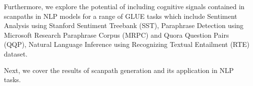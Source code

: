 

Furthermore, we explore the potential of including cognitive signals contained in scanpaths in NLP models for a range of GLUE tasks which include Sentiment Analysis using Stanford Sentiment Treebank (SST), Paraphrase Detection using Microsoft Research Paraphrase Corpus (MRPC) and Quora Question Pairs (QQP), Natural Language Inference using Recognizing Textual Entailment (RTE) dataset.

Next, we cover the results of scanpath generation and its application in NLP tasks.



